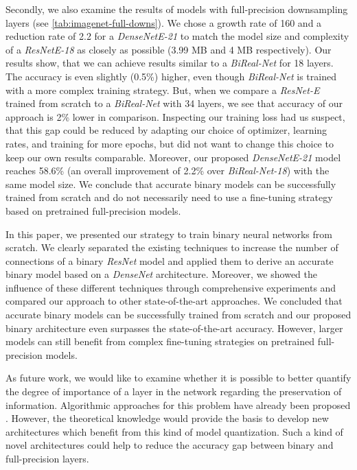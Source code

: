 \documentclass[10pt,twocolumn,letterpaper]{article}
\newcommand{\arch}[1]{\emph{#1}}
\begin{document}
Secondly, we also examine the results of models with full-precision downsampling layers (see \autoref{tab:imagenet-full-downs}).
We chose a growth rate of 160 and a reduction rate of 2.2 for a \arch{DenseNetE-21} to match the model size and complexity of a \arch{ResNetE-18} as closely as possible (3.99 MB and 4 MB respectively).
Our results show, that we can achieve results similar to a \arch{BiReal-Net}\cite{Liu_2018_ECCV} for 18 layers.
The accuracy is even slightly (0.5\%) higher, even though \arch{BiReal-Net} is trained with a more complex training strategy.
But, when we compare a \arch{ResNet-E} trained from scratch to a \arch{BiReal-Net} with 34 layers, we see that accuracy of our approach is 2\% lower in comparison.
Inspecting our training loss had us suspect, that this gap could be reduced by adapting our choice of optimizer, learning rates, and training for more epochs, but did not want to change this choice to keep our own results comparable.
Moreover, our proposed \arch{DenseNetE-21} model reaches 58.6\% (an overall improvement of 2.2\% over \arch{BiReal-Net-18}) with the same model size.
We conclude that accurate binary models can be successfully trained from scratch and do not necessarily need to use a fine-tuning strategy based on pretrained full-precision models.

In this paper, we presented our strategy to train binary neural networks from scratch.
We clearly separated the existing techniques to increase the number of connections of a binary \arch{ResNet} model and applied them to derive an accurate binary model based on a \arch{DenseNet} architecture.
Moreover, we showed the influence of these different techniques through comprehensive experiments and compared our approach to other state-of-the-art approaches.
We concluded that accurate binary models can be successfully trained from scratch and our proposed binary architecture even surpasses the state-of-the-art accuracy.
However, larger models can still benefit from complex fine-tuning strategies on pretrained full-precision models.

As future work, we would like to examine whether it is possible to better quantify the degree of importance of a layer in the network regarding the preservation of information.
Algorithmic approaches for this problem have already been proposed \cite{zhou2018adaptive}.
However, the theoretical knowledge would provide the basis to develop new architectures which benefit from this kind of model quantization.
Such a kind of novel architectures could help to reduce the accuracy gap between binary and full-precision layers.


{\small


}
\end{document}
